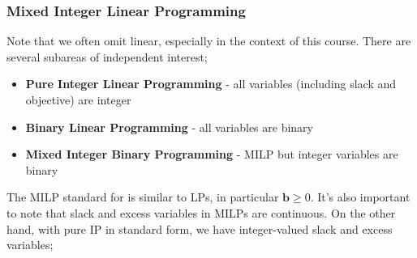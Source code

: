 \documentclass[a4paper, 12pt]{article}
\renewcommand{\vec}[1]{\boldsymbol{#1}}
\begin{document}
            \subsubsection*{Mixed Integer Linear Programming}
                Note that we often omit linear, especially in the context of this course.
                There are several subareas of independent interest;
                \begin{itemize}
                    \itemsep0em
                    \item \textbf{Pure Integer Linear Programming} - all variables (including slack and objective) are integer
                    \item \textbf{Binary Linear Programming} - all variables are binary
                    \item \textbf{Mixed Integer Binary Programming} - MILP but integer variables are binary
                \end{itemize}
                The MILP standard for is similar to LPs, in particular $\vec{b} \geq 0$.
                It's also important to note that slack and excess variables in MILPs are continuous.
                On the other hand, with pure IP in standard form, we have integer-valued slack and excess variables;
\end{document}
